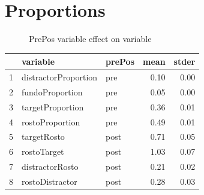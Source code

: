 \documentclass{article}
\begin{document}
\section{Proportions}

\begin{figure}[H]
  \caption{PrePos variable effect on variable}
  \noindent{}
  \centering
\end{figure}

\begin{table}[ht]
\centering
\begin{tabular}{rllrr}
  \hline
 & variable & prePos & mean & stder \\ 
  \hline
  1 & distractorProportion & pre & 0.10 & 0.00 \\ 
  2 & fundoProportion & pre & 0.05 & 0.00 \\ 
  3 & targetProportion & pre & 0.36 & 0.01 \\ 
  4 & rostoProportion & pre & 0.49 & 0.01 \\ 
  5 & targetRosto & post & 0.71 & 0.05 \\ 
  6 & rostoTarget & post & 1.03 & 0.07 \\ 
  7 & distractorRosto & post & 0.21 & 0.02 \\ 
  8 & rostoDistractor & post & 0.28 & 0.03 \\ 
   \hline
\end{tabular}
\end{table}
\end{document}
